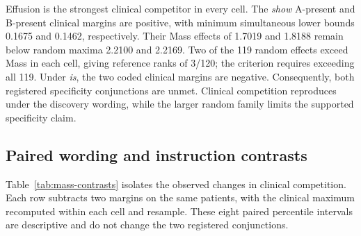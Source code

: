 Effusion is the strongest clinical competitor in every cell.
The \textit{show} A-present and B-present clinical margins are positive,
with minimum simultaneous lower bounds 0.1675 and 0.1462, respectively.
Their Mass effects of 1.7019 and 1.8188 remain below random maxima 2.2100
and 2.2169. Two of the 119 random effects exceed Mass in each cell,
giving reference ranks of 3/120; the criterion requires exceeding all 119.
Under \textit{is}, the two coded clinical margins are negative.
Consequently, both registered specificity conjunctions are unmet.
Clinical competition reproduces under the discovery wording, while the
larger random family limits the supported specificity claim.

\subsection{Paired wording and instruction contrasts}

Table~\ref{tab:mass-contrasts} isolates the observed changes in clinical
competition. Each row subtracts two margins on the same patients, with
the clinical maximum recomputed within each cell and resample.
These eight paired percentile intervals are descriptive and do not change
the two registered conjunctions.

\begin{table}[H]
\centering
\caption{Paired changes in Mass clinical competition.}
\label{tab:mass-contrasts}
\end{table}

